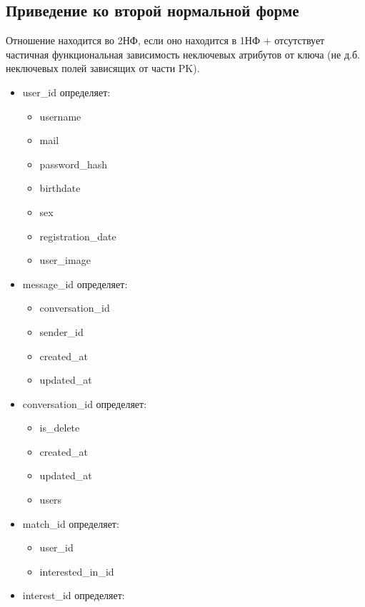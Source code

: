 \subsection{Приведение ко второй нормальной форме}

Отношение находится во 2НФ, если оно находится в 1НФ + отсутствует частичная функциональная зависимость неключевых атрибутов от ключа (не д.б. неключевых полей зависящих от части PK).

\begin{itemize}
    \item user\_id определяет:
        \begin{itemize}
            \item username
            \item mail
            \item password\_hash
            \item birthdate
            \item sex
            \item registration\_date
            \item user\_image
        \end{itemize}
    \item message\_id определяет:
        \begin{itemize}
            \item conversation\_id
            \item sender\_id
            \item created\_at
            \item updated\_at
        \end{itemize}
    \item conversation\_id определяет:
        \begin{itemize}
            \item is\_delete
            \item created\_at
            \item updated\_at
            \item users
        \end{itemize}
    \item match\_id определяет:
        \begin{itemize}
            \item user\_id
            \item interested\_in\_id
        \end{itemize}
    \item interest\_id определяет:
        \begin{itemize}

\end{itemize}
\end{itemize}
